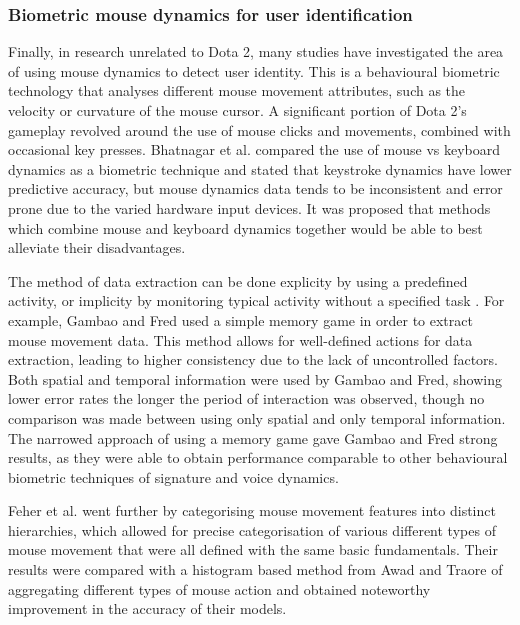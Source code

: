 \documentclass[Report.tex]{subfiles}
\begin{document}
\subsubsection{Biometric mouse dynamics for user identification}
Finally, in research unrelated to Dota 2, many studies have investigated the area of using mouse dynamics to detect user identity. This is a behavioural biometric technology that analyses different mouse movement attributes, such as the velocity or curvature of the mouse cursor. A significant portion of Dota 2's gameplay revolved around the use of mouse clicks and movements, combined with occasional key presses. Bhatnagar et al. \cite{mouse-vs-keyboard} compared the use of mouse vs keyboard dynamics as a biometric technique and stated that keystroke dynamics have lower predictive accuracy, but mouse dynamics data tends to be inconsistent and error prone due to the varied hardware input devices. It was proposed that methods which combine mouse and keyboard dynamics together would be able to best alleviate their disadvantages.

The method of data extraction can be done explicity by using a predefined activity, or implicity by monitoring typical activity without a specified task \cite{mouse-dynamics}. For example, Gambao and Fred \cite{mouse-features} used a simple memory game in order to extract mouse movement data. This method allows for well-defined actions for data extraction, leading to higher consistency due to the lack of uncontrolled factors. Both spatial and temporal information were used by Gambao and Fred, showing lower error rates the longer the period of interaction was observed, though no comparison was made between using only spatial and only temporal information. The narrowed approach of using a memory game gave Gambao and Fred strong results, as they were able to obtain performance comparable to other behavioural biometric techniques of signature and voice dynamics. 


Feher et al. \cite{mouse-dynamics} went further by categorising mouse movement features into distinct hierarchies, which allowed for precise categorisation of various different types of mouse movement that were all defined with the same basic fundamentals. Their results were compared with a histogram based method from Awad and Traore \cite{mouse-histogram} of aggregating different types of mouse action and obtained noteworthy improvement in the accuracy of their models. 
\end{document}

